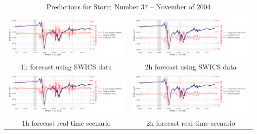 \documentclass[draft,sw]{agutexSI2019}
\begin{document}
\begin{table}
\centering
\begin{tabular}{cc}
\includegraphics[width=0.49\linewidth]{paper_plots_shade/1h_swics/1h_swics_storm_37.png}
&
\includegraphics[width=0.49\linewidth]{paper_plots_shade/2h_swics/2h_swics_storm_37.png}
\\
1h forecast using SWICS data & 2h forecast using SWICS data
\vspace*{12pt}
\\
\includegraphics[width=0.49\linewidth]{paper_plots_shade/1h_rt/1h_rt_storm_37.png}
&
\includegraphics[width=0.49\linewidth]{paper_plots_shade/2h_rt/2h_rt_storm_37.png}
\\
1h forecast real-time scenario & 2h forecast real-time scenario 
\vspace*{12pt}
\\
\end{tabular}
\caption{Predictions for Storm Number 37 -- November of 2004}
\label{storm-37}
\end{table}
\end{document}
